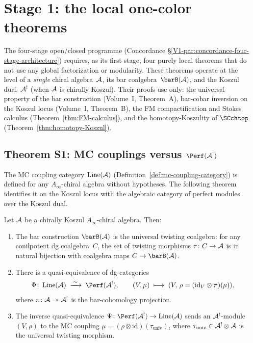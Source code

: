 \section{Stage 1: the local one-color theorems}
\label{sec:stage1-local-theorems}

The four-stage open/closed programme
(Concordance \S\ref{V1-par:concordance-four-stage-architecture})
requires, as its first stage, four purely local theorems that
do not use any global factorization or modularity.
These theorems operate at the level of a \emph{single} chiral
algebra~$\mathcal{A}$, its bar coalgebra~$\barB(\cA)$,
and the Koszul dual~$\mathcal{A}^!$ (when $\mathcal{A}$ is chirally Koszul).
Their proofs use only:
the universal property of the bar construction
(Volume~I, Theorem~A),
bar-cobar inversion on the Koszul locus
(Volume~I, Theorem~B),
the FM compactification and Stokes calculus
(Theorem~\ref{thm:FM-calculus}),
and the homotopy-Koszulity of $\SCchtop$
(Theorem~\ref{thm:homotopy-Koszul}).

\subsection{Theorem S1: MC couplings versus $\Perf(\cA^!)$}
\label{subsec:mc-couplings-perf}

The MC coupling category $\operatorname{Line}(\mathcal{A})$
(Definition~\ref{def:mc-coupling-category}) is defined for any
$A_\infty$-chiral algebra without hypotheses. The following
theorem identifies it on the Koszul locus with the algebraic
category of perfect modules over the Koszul dual.

\begin{theorem}
\label{thm:mc-couplings-perf}
Let $\mathcal{A}$ be a chirally Koszul $A_\infty$-chiral algebra. Then:
\begin{enumerate}[label=\textup{(\roman*)}]
\item The bar construction $\barB(\cA)$ is the universal twisting
 coalgebra: for any conilpotent dg coalgebra~$C$, the set of
 twisting morphisms $\tau \colon C \to \mathcal{A}$ is in natural bijection
 with coalgebra maps $C \to \barB(\cA)$.

\item There is a quasi-equivalence of dg-categories
 \[
 \Phi \colon \operatorname{Line}(\cA)
 \;\xrightarrow{\;\sim\;}\;
 \Perf(\cA^!),
 \qquad
 (V, \mu)
 \;\longmapsto\;
 (V,\, \rho = (\mathrm{id}_V \otimes \pi)(\mu)),
 \]
 where $\pi \colon \mathcal{A} \twoheadrightarrow \mathcal{A}^!$ is the
 bar-cohomology projection.

\item The inverse quasi-equivalence
 $\Psi \colon \Perf(\cA^!) \to \operatorname{Line}(\cA)$
 sends an $\mathcal{A}^!$-module $(V, \rho)$ to the MC coupling
 $\mu = (\rho \otimes \mathrm{id})(\tau_{\mathrm{univ}})$,
 where $\tau_{\mathrm{univ}} \in \mathcal{A}^! \otimes \mathcal{A}$ is the
 universal twisting morphism.
\end{enumerate}
\end{theorem}

